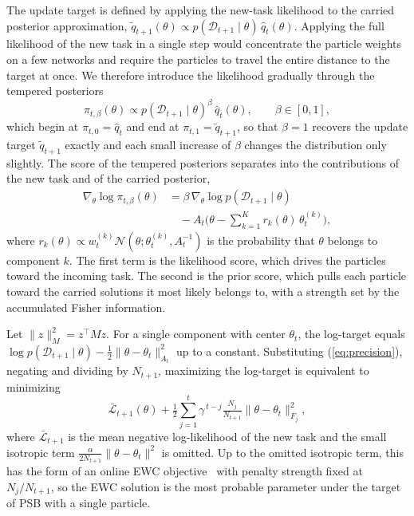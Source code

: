 \documentclass{article}
\begin{document}
The update target is defined by applying the new-task likelihood to the carried posterior approximation,
$\tilde q_{t+1}(\theta)\propto p(\mathcal{D}_{t+1}\mid\theta)\,\hat q_t(\theta)$.
Applying the full likelihood of the new task in a single step
would concentrate the particle weights on a few networks and require the
particles to travel the entire distance to the target at once. We therefore
introduce the likelihood gradually through the tempered posteriors
\begin{equation}
    \pi_{t,\beta}(\theta)\propto p(\mathcal{D}_{t+1}\mid\theta)^{\beta}\,
    \hat q_t(\theta), \qquad \beta\in[0,1],
    \label{eq:tempered}
\end{equation}
which begin at $\pi_{t,0}=\hat q_t$ and end at $\pi_{t,1}=\tilde q_{t+1}$, so that $\beta=1$ recovers the update target $\tilde q_{t+1}$ exactly and each small increase of $\beta$ changes the distribution only slightly. The score of the tempered posteriors separates into the contributions of the new task and of the carried posterior,
\begin{equation}
\begin{split}
    \nabla_\theta\log\pi_{t,\beta}(\theta)
    &= \beta\,\nabla_\theta\log p(\mathcal{D}_{t+1}\mid\theta)\\
    &\quad -A_t\Big(\theta-\textstyle\sum_{k=1}^{K}r_k(\theta)\,\theta_t^{(k)}\Big),
\end{split}
\label{eq:pathscore}
\end{equation}
where $r_k(\theta)\propto w_t^{(k)}\mathcal{N}(\theta;\theta_t^{(k)},A_t^{-1})$
is the probability that $\theta$ belongs to component $k$. The first term is the
likelihood score, which drives the particles toward the incoming task. The
second is the prior score, which pulls each particle toward the carried
solutions it most likely belongs to, with a strength set by the accumulated
Fisher information.

Let $\|z\|_M^2=z^{\top}Mz$. For a single component with center $\theta_t$, the
log-target equals
$\log p(\mathcal{D}_{t+1}\mid\theta)-\tfrac12\|\theta-\theta_t\|_{A_t}^2$ up to
a constant. Substituting (\ref{eq:precision}),
negating and dividing by $N_{t+1}$, maximizing the log-target is equivalent to
minimizing
\begin{equation}
    \bar{\mathcal L}_{t+1}(\theta)
    +\tfrac{1}{2}\textstyle\sum_{j=1}^{t}\gamma^{\,t-j}\tfrac{N_j}{N_{t+1}}
    \|\theta-\theta_t\|_{F_j}^{2},
    \label{eq:ewc}
\end{equation}
where $\bar{\mathcal L}_{t+1}$ is the mean negative log-likelihood of the new task and
the small isotropic term $\tfrac{\alpha}{2N_{t+1}}\|\theta-\theta_t\|^2$ is
omitted. Up to the omitted isotropic term, this has the form of an online EWC objective~\cite{kirkpatrick2017ewc,schwarz2018progress} with penalty strength
fixed at $N_j/N_{t+1}$, so the EWC solution is the most probable parameter under
the target of PSB with a single particle.
\end{document}
